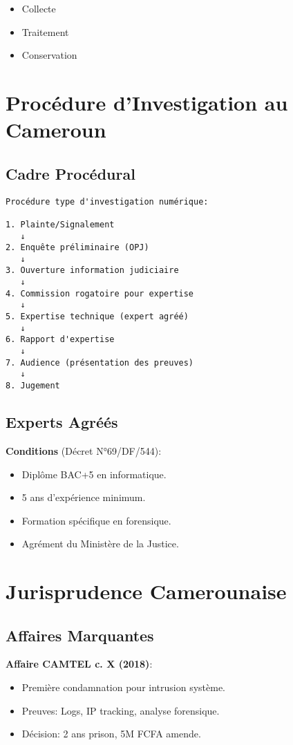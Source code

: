 \begin{itemize}
\item Collecte
\item Traitement
\item Conservation 
\end{itemize}

\section{Procédure d'Investigation au Cameroun}
\subsection{Cadre Procédural}
\begin{verbatim}
Procédure type d'investigation numérique:

1. Plainte/Signalement
   ↓
2. Enquête préliminaire (OPJ)
   ↓
3. Ouverture information judiciaire
   ↓
4. Commission rogatoire pour expertise
   ↓
5. Expertise technique (expert agréé)
   ↓
6. Rapport d'expertise
   ↓
7. Audience (présentation des preuves)
   ↓
8. Jugement
\end{verbatim}

\subsection{Experts Agréés}
\textbf{Conditions} (Décret N°69/DF/544):

\begin{itemize}
\item Diplôme BAC+5 en informatique.
\item 5 ans d'expérience minimum.
\item Formation spécifique en forensique.
\item Agrément du Ministère de la Justice.
\end{itemize}

\section{Jurisprudence Camerounaise}
\subsection{Affaires Marquantes}
\textbf{Affaire CAMTEL c. X (2018)}:

\begin{itemize}
\item Première condamnation pour intrusion système.
\item Preuves: Logs, IP tracking, analyse forensique.
\item Décision: 2 ans prison, 5M FCFA amende.
\end{itemize}


